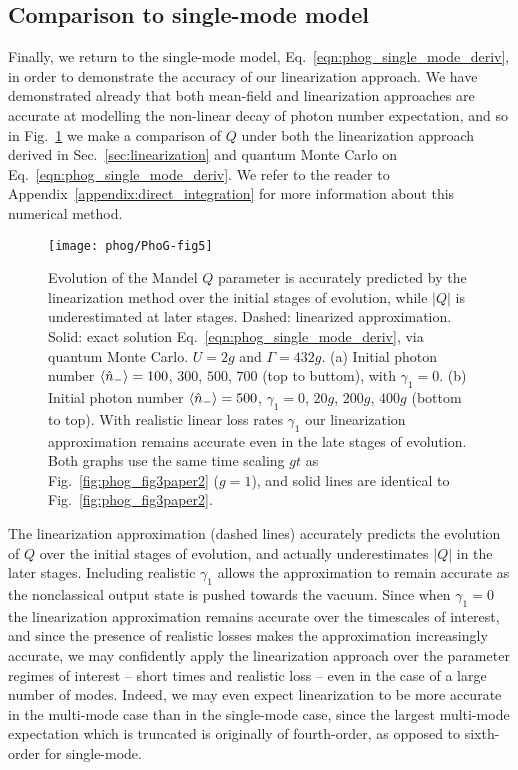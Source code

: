 \subsection{Comparison to single-mode model}
Finally, we return to the single-mode model, Eq.~\ref{eqn:phog_single_mode_deriv}, in order to demonstrate the accuracy of our linearization approach. We have demonstrated already that both mean-field and linearization approaches are accurate at modelling the non-linear decay of photon number expectation, and so in Fig.~\ref{fig:phog_single_mode_linearization} we make a comparison of $Q$ under both the linearization approach derived in Sec.~\ref{sec:linearization} and quantum Monte Carlo on Eq.~\ref{eqn:phog_single_mode_deriv}. We refer to the reader to Appendix~\ref{appendix:direct_integration} for more information about this numerical method.

\begin{figure}[htp]
\captionsetup{width=\linewidth}
\centering
\texttt{[image: phog/PhoG-fig5]}
\caption{\label{fig:phog_single_mode_linearization} Evolution of the Mandel $Q$ parameter is accurately predicted by the linearization method over the initial stages of evolution, while $\left|Q\right|$ is underestimated at later stages. Dashed: linearized approximation. Solid: exact solution Eq.~\ref{eqn:phog_single_mode_deriv}, via quantum Monte Carlo. $U = 2g$ and $\Gamma = 432g$. (a) Initial photon number $\ev{\hat{n}_-} = 100$, $300$, $500$, $700$ (top to buttom), with $\gamma_1 = 0$. (b) Initial photon number $\ev{\hat{n}_-}=500$, $\gamma_1 = 0$, $20g$, $200g$, $400g$ (bottom to top). With realistic linear loss rates $\gamma_1$ our linearization approximation remains accurate even in the late stages of evolution. Both graphs use the same time scaling $g t$ as Fig.~\ref{fig:phog_fig3paper2} ($g=1$), and solid lines are identical to Fig.~\ref{fig:phog_fig3paper2}.}
\end{figure}

The linearization approximation (dashed lines) accurately predicts the evolution of $Q$ over the initial stages of evolution, and actually underestimates $\left|Q\right|$ in the later stages. Including realistic $\gamma_1$ allows the approximation to remain accurate as the nonclassical output state is pushed towards the vacuum. Since when $\gamma_1 = 0$ the linearization approximation remains accurate over the timescales of interest, and since the presence of realistic losses makes the approximation increasingly accurate, we may confidently apply the linearization approach over the parameter regimes of interest -- short times and realistic loss -- even in the case of a large number of modes. Indeed, we may even expect linearization to be more accurate in the multi-mode case than in the single-mode case, since the largest multi-mode expectation which is truncated is originally of fourth-order, as opposed to sixth-order for single-mode.

